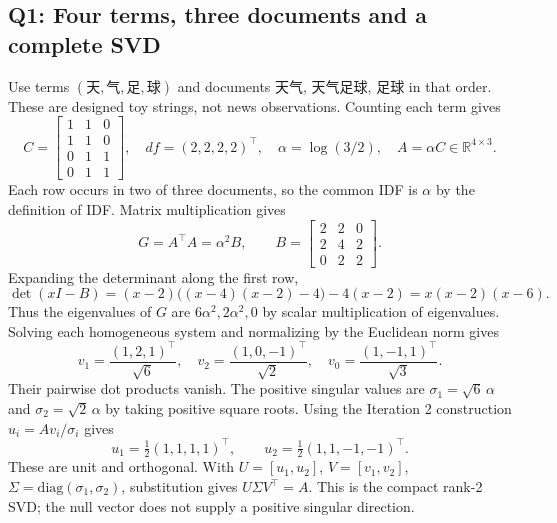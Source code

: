 \documentclass[11pt]{article}
\newcommand{\R}{\mathbb{R}}
\begin{document}
\subsection{Q1: Four terms, three documents and a complete SVD}
Use terms $(\text{天},\text{气},\text{足},\text{球})$ and documents
$\text{天气}$, $\text{天气足球}$, $\text{足球}$ in that order.
These are designed toy strings, not news observations.
Counting each term gives
\[
C=\begin{bmatrix}1&1&0\\1&1&0\\0&1&1\\0&1&1\end{bmatrix},
\quad df=(2,2,2,2)^\top,\quad
\alpha=\log(3/2),\quad A=\alpha C\in\R^{4\times3}.
\]
Each row occurs in two of three documents, so the common IDF is $\alpha$ by
the definition of IDF. Matrix multiplication gives
\[
G=A^\top A=\alpha^2 B,\qquad
B=\begin{bmatrix}2&2&0\\2&4&2\\0&2&2\end{bmatrix}.
\]
Expanding the determinant along the first row,
\[
\det(xI-B)=(x-2)\big((x-4)(x-2)-4\big)-4(x-2)
=x(x-2)(x-6).
\]
Thus the eigenvalues of $G$ are $6\alpha^2,2\alpha^2,0$ by scalar
multiplication of eigenvalues. Solving each homogeneous system and
normalizing by the Euclidean norm gives
\[
v_1=\frac{(1,2,1)^\top}{\sqrt6},\quad
v_2=\frac{(1,0,-1)^\top}{\sqrt2},\quad
v_0=\frac{(1,-1,1)^\top}{\sqrt3}.
\]
Their pairwise dot products vanish. The positive singular values are
$\sigma_1=\sqrt6\,\alpha$ and $\sigma_2=\sqrt2\,\alpha$ by taking positive
square roots. Using the Iteration 2 construction $u_i=Av_i/\sigma_i$ gives
\[
u_1=\tfrac12(1,1,1,1)^\top,\qquad
u_2=\tfrac12(1,1,-1,-1)^\top.
\]
These are unit and orthogonal. With $U=[u_1,u_2]$, $V=[v_1,v_2]$,
$\Sigma=\mathrm{diag}(\sigma_1,\sigma_2)$, substitution gives
$U\Sigma V^\top=A$. This is the compact rank-2 SVD; the null vector
does not supply a positive singular direction.
\end{document}
